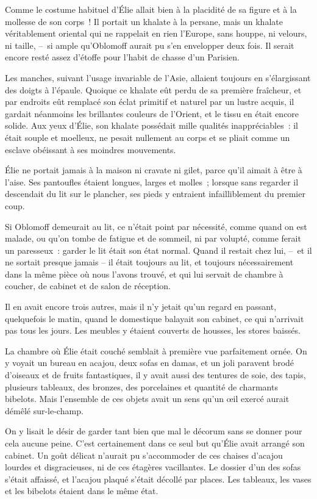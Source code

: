 \documentclass[french,twoside]{book} %
\begin{document}
Comme le costume habituel d’Élie allait bien à la placidité de sa figure et à la mollesse de son corps ! Il portait un khalate à la persane, mais un khalate véritablement oriental qui ne rappelait en rien l’Europe, sans houppe, ni velours, ni taille, – si ample qu’Oblomoff aurait pu s’en envelopper deux fois. Il serait encore resté assez d’étoffe pour l’habit de chasse d’un Parisien.\par
Les manches, suivant l’usage invariable de l’Asie, allaient toujours en s’élargissant des doigts à l’épaule. Quoique ce khalate eût perdu de sa première fraîcheur, et par endroits eût remplacé son éclat primitif et naturel par un lustre acquis, il gardait néanmoins les brillantes couleurs de l’Orient, et le tissu en était encore solide. Aux yeux d’Élie, son khalate possédait mille qualités inappréciables : il était souple et moelleux, ne pesait nullement au corps et se pliait comme un esclave obéissant à ses moindres mouvements.\par
Élie ne portait jamais à la maison ni cravate ni gilet, parce qu’il aimait à être à l’aise. Ses pantoufles étaient longues, larges et molles ; lorsque sans regarder il descendait du lit sur le plancher, ses pieds y entraient infailliblement du premier coup.\par
Si Oblomoff demeurait au lit, ce n’était point par nécessité, comme quand on est malade, ou qu’on tombe de fatigue et de sommeil, ni par volupté, comme ferait un paresseux : garder le lit était son état normal. Quand il restait chez lui, – et il ne sortait presque jamais – il était toujours au lit, et toujours nécessairement dans la même pièce où nous l’avons trouvé, et qui lui servait de chambre à coucher, de cabinet et de salon de réception.\par
Il en avait encore trois autres, mais il n’y jetait qu’un regard en passant, quelquefois le matin, quand le domestique balayait son cabinet, ce qui n’arrivait pas tous les jours. Les meubles y étaient couverts de housses, les stores baissés.\par
La chambre où Élie était couché semblait à première vue parfaitement ornée. On y voyait un bureau en acajou, deux sofas en damas, et un joli paravent brodé d’oiseaux et de fruits fantastiques, il y avait aussi des tentures de soie, des tapis, plusieurs tableaux, des bronzes, des porcelaines et quantité de charmants bibelots. Mais l’ensemble de ces objets avait un sens qu’un œil exercé aurait démêlé sur-le-champ.\par
On y lisait le désir de garder tant bien que mal le décorum sans se donner pour cela aucune peine. C’est certainement dans ce seul but qu’Élie avait arrangé son cabinet. Un goût délicat n’aurait pu s’accommoder de ces chaises d’acajou lourdes et disgracieuses, ni de ces étagères vacillantes. Le dossier d’un des sofas s’était affaissé, et l’acajou plaqué s’était décollé par places. Les tableaux, les vases et les bibelots étaient dans le même état.\par
\end{document}
